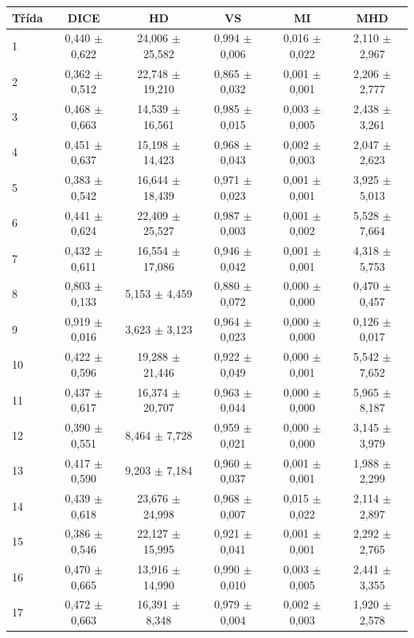 \begin{tabular}{l c c c c c}
 \hline
Třída & DICE & HD & VS & MI & MHD \\ \hline
1 & 0,440 $\pm$ 0,622 & 24,006 $\pm$ 25,582 & 0,994 $\pm$ 0,006 & 0,016 $\pm$ 0,022 & 2,110 $\pm$ 2,967 \\
2 & 0,362 $\pm$ 0,512 & 22,748 $\pm$ 19,210 & 0,865 $\pm$ 0,032 & 0,001 $\pm$ 0,001 & 2,206 $\pm$ 2,777 \\
3 & 0,468 $\pm$ 0,663 & 14,539 $\pm$ 16,561 & 0,985 $\pm$ 0,015 & 0,003 $\pm$ 0,005 & 2,438 $\pm$ 3,261 \\
4 & 0,451 $\pm$ 0,637 & 15,198 $\pm$ 14,423 & 0,968 $\pm$ 0,043 & 0,002 $\pm$ 0,003 & 2,047 $\pm$ 2,623 \\
5 & 0,383 $\pm$ 0,542 & 16,644 $\pm$ 18,439 & 0,971 $\pm$ 0,023 & 0,001 $\pm$ 0,001 & 3,925 $\pm$ 5,013 \\
6 & 0,441 $\pm$ 0,624 & 22,409 $\pm$ 25,527 & 0,987 $\pm$ 0,003 & 0,001 $\pm$ 0,002 & 5,528 $\pm$ 7,664 \\
7 & 0,432 $\pm$ 0,611 & 16,554 $\pm$ 17,086 & 0,946 $\pm$ 0,042 & 0,001 $\pm$ 0,001 & 4,318 $\pm$ 5,753 \\
8 & 0,803 $\pm$ 0,133 & 5,153 $\pm$ 4,459 & 0,880 $\pm$ 0,072 & 0,000 $\pm$ 0,000 & 0,470 $\pm$ 0,457 \\
9 & 0,919 $\pm$ 0,016 & 3,623 $\pm$ 3,123 & 0,964 $\pm$ 0,023 & 0,000 $\pm$ 0,000 & 0,126 $\pm$ 0,017 \\
10 & 0,422 $\pm$ 0,596 & 19,288 $\pm$ 21,446 & 0,922 $\pm$ 0,049 & 0,000 $\pm$ 0,001 & 5,542 $\pm$ 7,652 \\
11 & 0,437 $\pm$ 0,617 & 16,374 $\pm$ 20,707 & 0,963 $\pm$ 0,044 & 0,000 $\pm$ 0,000 & 5,965 $\pm$ 8,187 \\
12 & 0,390 $\pm$ 0,551 & 8,464 $\pm$ 7,728 & 0,959 $\pm$ 0,021 & 0,000 $\pm$ 0,000 & 3,145 $\pm$ 3,979 \\
13 & 0,417 $\pm$ 0,590 & 9,203 $\pm$ 7,184 & 0,960 $\pm$ 0,037 & 0,001 $\pm$ 0,001 & 1,988 $\pm$ 2,299 \\
14 & 0,439 $\pm$ 0,618 & 23,676 $\pm$ 24,998 & 0,968 $\pm$ 0,007 & 0,015 $\pm$ 0,022 & 2,114 $\pm$ 2,897 \\
15 & 0,386 $\pm$ 0,546 & 22,127 $\pm$ 15,995 & 0,921 $\pm$ 0,041 & 0,001 $\pm$ 0,001 & 2,292 $\pm$ 2,765 \\
16 & 0,470 $\pm$ 0,665 & 13,916 $\pm$ 14,990 & 0,990 $\pm$ 0,010 & 0,003 $\pm$ 0,005 & 2,441 $\pm$ 3,355 \\
17 & 0,472 $\pm$ 0,663 & 16,391 $\pm$ 8,348 & 0,979 $\pm$ 0,004 & 0,002 $\pm$ 0,003 & 1,920 $\pm$ 2,578 \\

\end{tabular}
